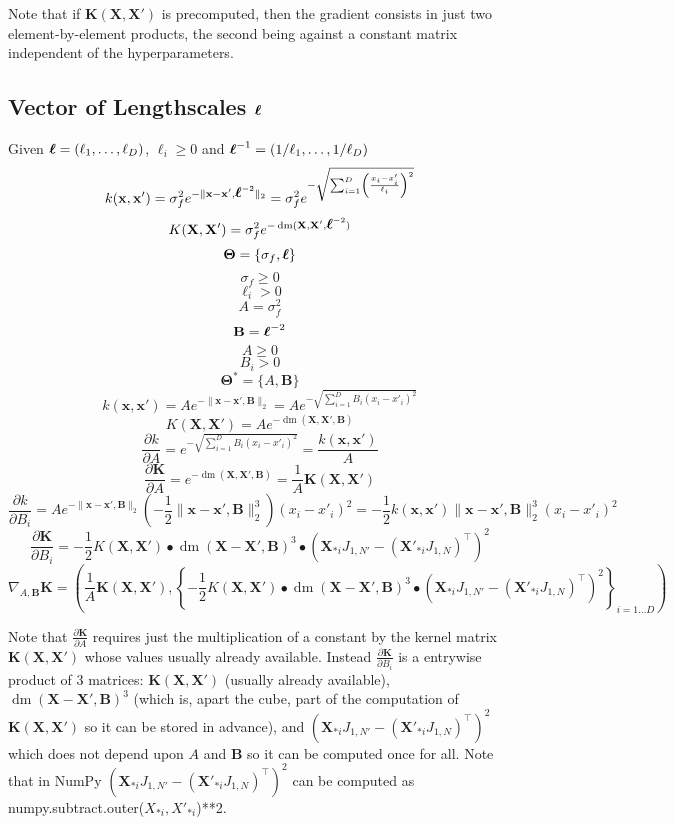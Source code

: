 \documentclass[a4paper,11pt]{article}
\newcommand\x{{\mathbf x}}
\newcommand\X{{\mathbf X}}
\newcommand\K{{\mathbf K}}
\newcommand\ELL{{\Ivec \ell}}
\DeclareMathOperator*{\dm}{dm}
\newcommand{\Ivec}[1]{\mbox{\boldmath $#1$}}
\begin{document}
Note that if $\K(\X,\X')$ is precomputed, then the gradient consists
in just two element-by-element products, the second being against a
constant matrix independent of the hyperparameters.

\subsection{Vector of Lengthscales $\Ivec{\ell}$}
Given $\Ivec{\ell} = (\ell_1,\ldots,\ell_D)$, $\ell_i \ge 0$ and
$\ELL^{-1} = (1/\ell_1,\ldots,1/\ell_D)$
$$k(\x,\x') = \sigma_f^2 e^{-\|\x-\x',\ELL^{-2}\|_2}= \sigma_f^2
  e^{-\sqrt{\sum_{i=1}^D \left(\frac{x_i - x'_i}{\ell_i}\right)^2}}$$
$$K(\X,\X') = \sigma_f^2 e^{-\dm(\X,\X',\ELL^{-2})}$$
$$\mathbf{\Theta} = \{ \sigma_f, \ELL\}$$
$$\sigma_f \ge 0$$
$$\ell_i > 0$$
$$A = \sigma_f^2$$
$$\mathbf{B} = \ELL^{-2}$$
$$A \ge 0$$
$$B_i > 0$$
$$\mathbf{\Theta}^* = \{ A, \mathbf{B}\}$$
$$k(\x,\x') = A e^{-\|\x-\x',\mathbf{B}\|_2} = A e^{-\sqrt{\sum_{i=1}^D
    B_i(x_i - x'_i)^2}}$$  
$$K(\X,\X') = A e^{-\dm(\X,\X',\mathbf{B})}$$
$$\frac{\partial k}{\partial A} = e^{-\sqrt{\sum_{i=1}^D B_i(x_i -
    x'_i)^2}} = \frac{k(\x,\x')}{A}$$
$$\frac{\partial \K}{\partial A} = e^{-\dm(\X,\X',\mathbf{B})} =
\frac{1}{A}\K(\X,\X')$$ 
$$\frac{\partial k}{\partial B_i} = A e^{-\|\x-\x',\mathbf{B}\|_2}
\left( -\frac{1}{2} \|\x-\x',\mathbf{B}\|_2^3 \right) (x_i - x'_i)^2 =
-\frac{1}{2} k(\x,\x') \|\x-\x',\mathbf{B}\|_2^3 (x_i - x'_i)^2 $$
$$\frac{\partial \K}{\partial B_i} = -\frac{1}{2} K(\X,\X')
\bullet \dm(\X-\X',\mathbf{B})^3 \bullet (\X_{*i}J_{1,N'}-
(\X'_{*i}J_{1,N})^{\top})^2$$
$$\nabla_{A,\mathbf{B}} \K = \left(\frac{1}{A}\K(\X,\X'), \left\{-\frac{1}{2}
    K(\X,\X') \bullet \dm(\X-\X',\mathbf{B})^3 \bullet
    (\X_{*i}J_{1,N'}- (\X'_{*i}J_{1,N})^{\top})^2 \right\}_{i=1 \ldots
    D} \right)$$

Note that $\frac{\partial \K}{\partial A}$ requires just the
multiplication of a constant by the kernel matrix $\K(\X,\X')$ whose
values usually already available. Instead $\frac{\partial \K}{\partial
  B_i}$ is a entrywise product of 3 matrices: $\K(\X,\X')$ (usually
already available), $\dm(\X-\X',\mathbf{B})^3$ (which is, apart the
cube, part of the computation of $\K(\X,\X')$ so it can be stored in
advance), and $(\X_{*i}J_{1,N'}- (\X'_{*i}J_{1,N})^{\top})^2$ which
does not depend upon $A$ and $\mathbf{B}$ so it can be computed once
for all. Note that in NumPy $(\X_{*i}J_{1,N'}-
(\X'_{*i}J_{1,N})^{\top})^2$ can be computed as {\ttfamily
  numpy.subtract.outer($X_{*i},X'_{*i}$)**2}.
\end{document}
